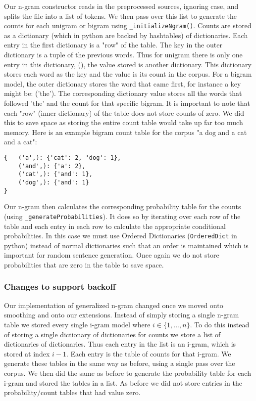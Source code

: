 \documentclass{article}
\begin{document}
Our n-gram constructor reads in the preprocessed sources, ignoring case, and splits the file into a list of tokens. We then pass over this list to generate the counts for each unigram or bigram using \texttt{\_initializeNgram()}. Counts are stored as a dictionary (which in python are  backed by hashtables) of dictionaries. Each entry in the first dictionary is a "row" of the table. The key in the outer dictionary is a tuple of the previous words. Thus for unigram there is only one entry in this dictionary, (), the value stored is another dictionary. This dictionary stores each word as the key and the value is its count in the corpus. For a bigram model, the outer dictionary stores the word that came first, for instance a key might be: ('the'). The corresponding dictionary value stores all the words that followed 'the' and the count for that specific bigram. It is important to note that each "row" (inner dictionary) of the table does not store counts of zero. We did this to save space as storing the entire count table would take up far too much memory. Here is an example bigram count table for the corpus "a dog and a cat and a cat":
\begin{verbatim}
{   ('a',): {'cat': 2, 'dog': 1},
    ('and',): {'a': 2},
    ('cat',): {'and': 1},
    ('dog',): {'and': 1}
}
\end{verbatim}

Our n-gram then calculates the corresponding probability table for the counts (using \texttt{\_generateProbabilities}). It does so by iterating over each row of the table and each entry in each row to calculate the appropriate conditional probabilities. In this case we must use Ordered Dictionaries (\texttt{OrderedDict} in python) instead of normal dictionaries such that an order is maintained which is important for random sentence generation. Once again we do not store probabilities that are zero in the table to save space. 

\subsubsection{Changes to support backoff}
Our implementation of generalized n-gram changed once we moved onto smoothing and onto our extensions. Instead of simply storing a single n-gram table we stored every single i-gram model where $i\in \lbrace 1,...,n \rbrace$. To do this instead of storing a single dictionary of dictionaries for counts we store a list of dictionaries of dictionaries. Thus each entry in the list is an i-gram, which is stored at index $i-1$. Each entry is the table of counts for that i-gram. We generate these tables in the same way as before, using a single pass over the corpus. We then did the same as before to generate the probability table for each i-gram and stored the tables in a list. As before we did not store entries in the probability/count tables that had value zero.
\end{document}
